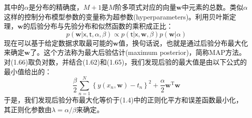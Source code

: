 \documentclass[b5paper]{book}
\numberwithin{equation}{chapter}
\begin{document}
{\begin{equation}
	\end{equation}
	\indent 其中的$\alpha$是分布的精确度，$M+1$是$M$阶多项式对应的向量$\mathbf{w}$中元素的总数。类似$\alpha$这样的控制分布模型参数的变量称为超参数(hyperparameters)。利用贝叶斯定理，$\mathbf{w}$的后验分布与先验分布和似然函数的乘积成正比：
	\begin{equation}
		p(\mathbf{w}|\boldsymbol{\mathsf{x}},\boldsymbol{\mathsf{t}},\alpha,\beta) \propto p(\boldsymbol{\mathsf{t}}|\boldsymbol{\mathsf{x}},\mathbf{w},\beta)p(\mathbf{w}|\alpha)
	\end{equation}
	\indent 现在可以基于给定数据求取最可能的$\mathbf{w}$值，换句话说，也就是通过后验分布最大化来确定$\mathbf{w}$了。这个方法称为最大后验估计(maximum posterior)，简称MAP方法。对(1.66)取负对数，并结合(1.62)和(1.65)，我们发现后验的最大值是由以下公式的最小值给出的：
	\begin{equation}
		\frac{\beta}{2}\sum_{n=1}^{N}\left\{y(x_n,\mathbf{w})-t_n\right\}^2 + \frac{\alpha}{2}\mathbf{w}^\mathrm{T}\mathbf{w}
	\end{equation}
	\indent 于是，我们发现后验分布最大化等价于(1.4)中的正则化平方和误差函数最小化，其正则化参数由$\lambda = \alpha/\beta$来确定。
	}
\end{document}
